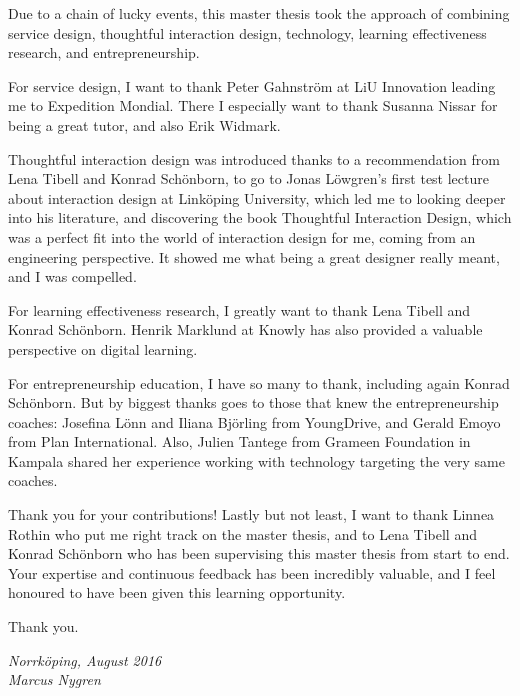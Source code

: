 \begin{acknowledgments}

  Due to a chain of lucky events, this master thesis took the approach of combining service design, thoughtful interaction design, technology, learning effectiveness research, and entrepreneurship.

For service design, I want to thank Peter Gahnström at LiU Innovation leading me to Expedition Mondial. There I especially want to thank Susanna Nissar for being a great tutor, and also Erik Widmark.

Thoughtful interaction design was introduced thanks to a recommendation from Lena Tibell and Konrad Schönborn, to go to Jonas Löwgren's first test lecture about interaction design at Linköping University, which led me to looking deeper into his literature, and discovering the book Thoughtful Interaction Design, which was a perfect fit into the world of interaction design for me, coming from an engineering perspective. It showed me what being a great designer really meant, and I was compelled.

For learning effectiveness research, I greatly want to thank Lena Tibell and Konrad Schönborn. Henrik Marklund at Knowly has also provided a valuable perspective on digital learning.

For entrepreneurship education, I have so many to thank, including again Konrad Schönborn. But by biggest thanks goes to those that knew the entrepreneurship coaches: Josefina Lönn and Iliana Björling from YoungDrive, and Gerald Emoyo from Plan International. Also, Julien Tantege from Grameen Foundation in Kampala shared her experience working with technology targeting the very same coaches.

Thank you for your contributions! Lastly but not least, I want to thank Linnea Rothin who put me right track on the master thesis, and to Lena Tibell and Konrad Schönborn who has been supervising this master thesis from start to end. Your expertise and continuous feedback has been incredibly valuable, and I feel honoured to have been given this learning opportunity.

Thank you.


  \addvspace{1em}
  \begin{flushright}
    \textit{%
      Norrköping, August 2016\\
      Marcus Nygren%
    }
  \end{flushright}
\end{acknowledgments}
